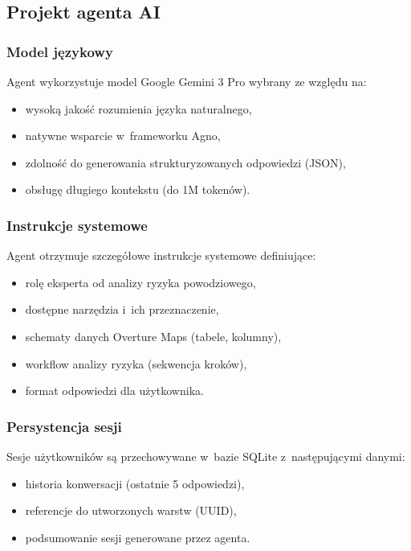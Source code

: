 \subsection{Projekt agenta AI}

\subsubsection{Model językowy}

Agent wykorzystuje model Google Gemini 3 Pro wybrany ze względu na:
\begin{itemize}
    \item wysoką jakość rozumienia języka naturalnego,
    \item natywne wsparcie w~frameworku Agno,
    \item zdolność do generowania strukturyzowanych odpowiedzi (JSON),
    \item obsługę długiego kontekstu (do 1M tokenów).
\end{itemize}

\subsubsection{Instrukcje systemowe}

Agent otrzymuje szczegółowe instrukcje systemowe definiujące:
\begin{itemize}
    \item rolę eksperta od analizy ryzyka powodziowego,
    \item dostępne narzędzia i~ich przeznaczenie,
    \item schematy danych Overture Maps (tabele, kolumny),
    \item workflow analizy ryzyka (sekwencja kroków),
    \item format odpowiedzi dla użytkownika.
\end{itemize}

\subsubsection{Persystencja sesji}

Sesje użytkowników są przechowywane w~bazie SQLite z~następującymi danymi:
\begin{itemize}
    \item historia konwersacji (ostatnie 5 odpowiedzi),
    \item referencje do utworzonych warstw (UUID),
    \item podsumowanie sesji generowane przez agenta.
\end{itemize}

